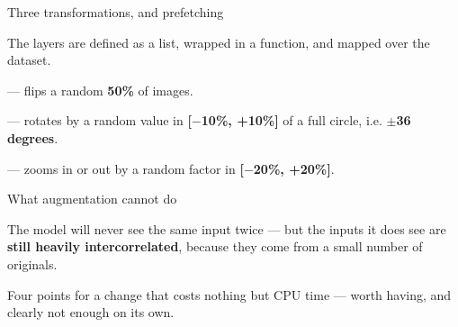 \documentclass[aspectratio=169,11pt,t]{beamer}
\begin{document}
\begin{frame}[shrink=25]{Three transformations, and prefetching}
{\fontsize{9.4}{12.6}\selectfont\color{fg2}The layers are defined as a list, wrapped in a function, and mapped over the dataset.\par}\vskip 4pt
\begin{ibullets}
\item {} --- flips a random \textbf{50\%} of images.
\item {} --- rotates by a random value in \textbf{[$-$10\%, +10\%]} of a full circle, i.e. \textbf{$\pm$36 degrees}.
\item {} --- zooms in or out by a random factor in \textbf{[$-$20\%, +20\%]}.
\end{ibullets}
\end{frame}

\begin{frame}[shrink=25]{What augmentation cannot do}
\begin{iband}[amber]
The model will never see the same input twice --- but the inputs it does see are \textbf{still heavily intercorrelated}, because they come from a small number of originals. 
\end{iband}
\begin{minipage}[t]{0.494\textwidth}
\end{minipage}%
\hfill
\begin{minipage}[t]{0.494\textwidth}
\end{minipage}%
{\fontsize{9.4}{12.6}\selectfont\color{fg2}Four points for a change that costs nothing but CPU time --- worth having, and clearly not enough on its own.\par}\vskip 4pt
\end{frame}

\end{document}
